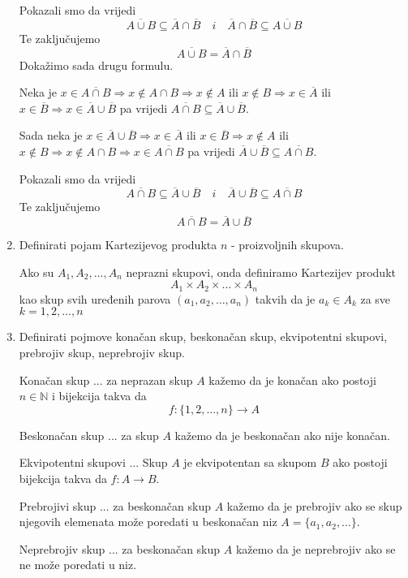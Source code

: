 \documentclass{article}
\begin{document}
\begin{enumerate}
Pokazali smo da vrijedi
$$\overline{A\cup B}\subseteq\overline{A}\cap\overline{B}\quad i \quad \overline{A}\cap\overline{B}\subseteq\overline{A\cup B}$$
Te zaključujemo
$$\overline{A\cup B} = \overline{A}\cap\overline{B}$$
Dokažimo sada drugu formulu.

Neka je $x\in\overline{A\cap B} \Longrightarrow x\notin A\cap B \Longrightarrow x \notin A$ ili $x\notin B\Longrightarrow x\in\overline{A}$ ili $x\in\overline{B}\Longrightarrow x\in\overline{A}\cup\overline{B}$ pa vrijedi $\overline{A\cap B}\subseteq\overline{A}\cup\overline{B}$.

Sada neka je $x\in\overline{A}\cup\overline{B}\Longrightarrow x\in\overline{A}$ ili $x\in\overline{B}\Longrightarrow x\notin A$ ili $x\notin B\Longrightarrow x\notin A\cap B\Longrightarrow x\in\overline{A\cap B}$ pa vrijedi $\overline{A}\cup\overline{B}\subseteq\overline{A\cap B}$.

Pokazali smo da vrijedi
$$\overline{A\cap B}\subseteq\overline{A}\cup\overline{B} \quad i \quad \overline{A}\cup\overline{B}\subseteq\overline{A\cap B}$$
Te zaključujemo
$$\overline{A\cap B} = \overline{A}\cup\overline{B}$$

\item Definirati pojam Kartezijevog produkta  $n$ - proizvoljnih skupova.

Ako su $A_1, A_2, \ldots, A_n$ neprazni skupovi, onda definiramo Kartezijev produkt
$$A_1 \times A_2 \times\ldots\times A_n$$
kao skup svih uređenih parova $(a_1, a_2, \ldots, a_n)$ takvih da je $a_k\in A_k$ za sve $k = 1, 2, \ldots, n$

\item Definirati pojmove konačan skup, beskonačan skup, ekvipotentni skupovi, prebrojiv skup, neprebrojiv skup.

Konačan skup ... za neprazan skup $A$ kažemo da je konačan ako postoji $n\in\mathbb{N}$ i bijekcija takva da $$f: \{1, 2, \ldots, n\}\to A$$

Beskonačan skup ... za skup $A$ kažemo da je beskonačan ako nije konačan.

Ekvipotentni skupovi ... Skup $A$ je ekvipotentan sa skupom $B$ ako postoji bijekcija takva da $f: A\to B$.

Prebrojivi skup ... za beskonačan skup $A$ kažemo da je prebrojiv ako se skup njegovih elemenata može poredati u beskonačan niz $ A = \{a_1, a_2, \ldots\}$.

Neprebrojiv skup ... za beskonačan skup $A$ kažemo da je neprebrojiv ako se ne može poredati u niz.


\end{enumerate}
\end{document}

